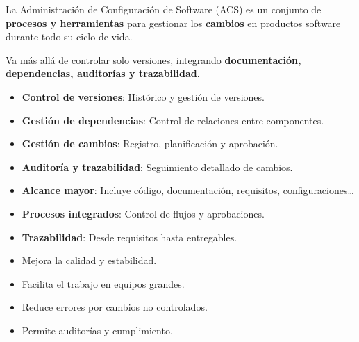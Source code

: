 \documentclass[a4paper,11pt]{report}
\begin{document}
    \begin{multicols}{2}

        \begin{cajaazul}
            La Administración de Configuración de Software (ACS) es un conjunto de \textbf{procesos y herramientas} para gestionar los \textbf{cambios} en productos software durante todo su ciclo de vida.

            Va más allá de controlar solo versiones, integrando \textbf{documentación, dependencias, auditorías y trazabilidad}.
        \end{cajaazul}

        \vspace{0.5em}

        \begin{cajaverde}
            \begin{itemize}[leftmargin=*]
                \item \textbf{Control de versiones}: Histórico y gestión de versiones.
                \item \textbf{Gestión de dependencias}: Control de relaciones entre componentes.
                \item \textbf{Gestión de cambios}: Registro, planificación y aprobación.
                \item \textbf{Auditoría y trazabilidad}: Seguimiento detallado de cambios.
            \end{itemize}
        \end{cajaverde}

        \vspace{0.5em}
        \deactivatequoting
        \begin{cajanaranja}
            \begin{itemize}[leftmargin=*]
                \item \textbf{Alcance mayor}: Incluye código, documentación, requisitos, configuraciones\ldots
                \item \textbf{Procesos integrados}: Control de flujos y aprobaciones.
                \item \textbf{Trazabilidad}: Desde requisitos hasta entregables.
            \end{itemize}
        \end{cajanaranja}
        \activatequoting
        \vspace{0.5em}

        \begin{cajarosa}[Beneficios]
            \begin{itemize}[leftmargin=*]
                \item Mejora la calidad y estabilidad.
                \item Facilita el trabajo en equipos grandes.
                \item Reduce errores por cambios no controlados.
                \item Permite auditorías y cumplimiento.
            \end{itemize}
        \end{cajarosa}


\end{multicols}
\end{document}
